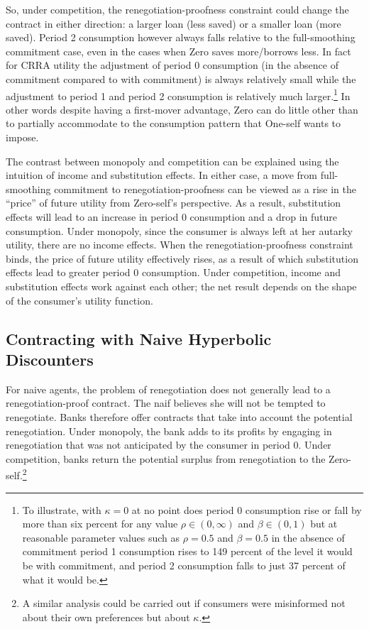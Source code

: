 \documentclass[11pt,english]{article}
\theoremstyle{plain}
\theoremstyle{definition}
\begin{document}
So, under competition, the renegotiation-proofness constraint could
change the contract in either direction: a larger loan (less saved)
or a smaller loan (more saved). Period 2 consumption however always
falls relative to the full-smoothing commitment case, even in the
cases when Zero saves more/borrows less. In fact for CRRA utility
the adjustment of period 0 consumption (in the absence of commitment
compared to with commitment) is always relatively small while the
adjustment to period 1 and period 2 consumption is relatively much
larger.\footnote{To illustrate, with $\kappa=0$ at no point does period 0 consumption
rise or fall by more than six percent for any value $\rho\in(0,\infty)$
and $\beta\in(0,1)$ but at reasonable parameter values such as $\rho=0.5$
and $\beta=0.5$ in the absence of commitment period 1 consumption
rises to 149 percent of the level it would be with commitment, and
period 2 consumption falls to just 37 percent of what it would be.} In other words despite having a first-mover advantage, Zero can do
little other than to partially accommodate to the consumption pattern
that One-self wants to impose.

The contrast between monopoly and competition can be explained using
the intuition of income and substitution effects. In either case,
a move from full-smoothing commitment to renegotiation-proofness can
be viewed as a rise in the ``price'' of future utility from Zero-self's
perspective. As a result, substitution effects will lead to an increase
in period 0 consumption and a drop in future consumption. Under monopoly,
since the consumer is always left at her autarky utility, there are
no income effects. When the renegotiation-proofness constraint binds,
the price of future utility effectively rises, as a result of which
substitution effects lead to greater period 0 consumption. Under competition,
income and substitution effects work against each other; the net result
depends on the shape of the consumer's utility function.

\subsection{Contracting with Naive Hyperbolic Discounters}

For naive agents, the problem of renegotiation does not generally
lead to a renegotiation-proof contract. The naif believes she will
not be tempted to renegotiate. Banks therefore offer contracts that
take into account the potential renegotiation. Under monopoly, the
bank adds to its profits by engaging in renegotiation that was not
anticipated by the consumer in period 0. Under competition, banks
return the potential surplus from renegotiation to the Zero-self.\footnote{A similar analysis could be carried out if consumers were misinformed
not about their own preferences but about $\kappa$.}
\end{document}
